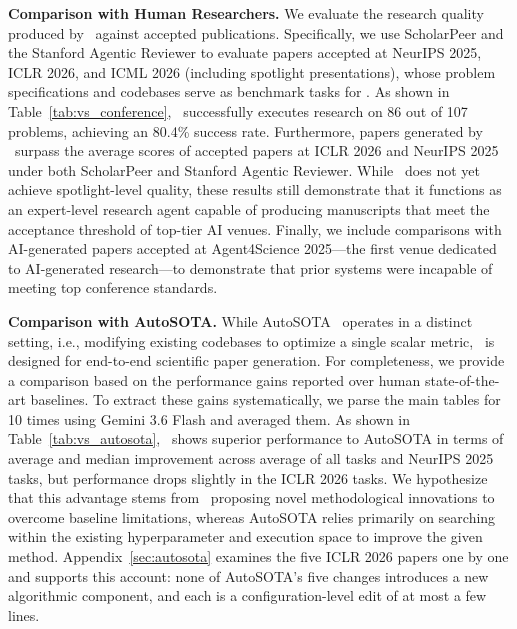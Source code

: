 
\noindent\textbf{Comparison with Human Researchers.} We evaluate the research quality produced by \sname~against accepted publications. Specifically, we use ScholarPeer and the Stanford Agentic Reviewer to evaluate papers accepted at NeurIPS 2025, ICLR 2026, and ICML 2026 (including spotlight presentations), whose problem specifications and codebases serve as benchmark tasks for \sname. As shown in Table~\ref{tab:vs_conference}, \sname~successfully executes research on 86 out of 107 problems, achieving an 80.4\% success rate. Furthermore, papers generated by \sname~surpass the average scores of accepted papers at ICLR 2026 and NeurIPS 2025 under both ScholarPeer and Stanford Agentic Reviewer. While \sname~does not yet achieve spotlight-level quality, these results still demonstrate that it functions as an expert-level research agent capable of producing manuscripts that meet the acceptance threshold of top-tier AI venues. Finally, we include comparisons with AI-generated papers accepted at Agent4Science 2025—the first venue dedicated to AI-generated research—to demonstrate that prior systems were incapable of meeting top conference standards.


\noindent\textbf{Comparison with AutoSOTA.} While AutoSOTA~\citep{li2026autosota} operates in a distinct setting, i.e., modifying existing codebases to optimize a single scalar metric, \sname~is designed for end-to-end scientific paper generation. For completeness, we provide a comparison based on the performance gains reported over human state-of-the-art baselines. To extract these gains systematically, we parse the main tables for 10 times using Gemini 3.6 Flash and averaged them. As shown in Table~\ref{tab:vs_autosota}, \sname~shows superior performance to AutoSOTA in terms of average and median improvement across average of all tasks and NeurIPS 2025 tasks, but performance drops slightly in the ICLR 2026 tasks.
We hypothesize that this advantage stems from \sname~proposing novel methodological innovations to overcome baseline limitations, whereas AutoSOTA relies primarily on searching within the existing hyperparameter and execution space to improve the given method. Appendix~\ref{sec:autosota} examines the five ICLR 2026 papers one by one and supports this account: none of AutoSOTA's five changes introduces a new algorithmic component, and each is a configuration-level edit of at most a few lines.

